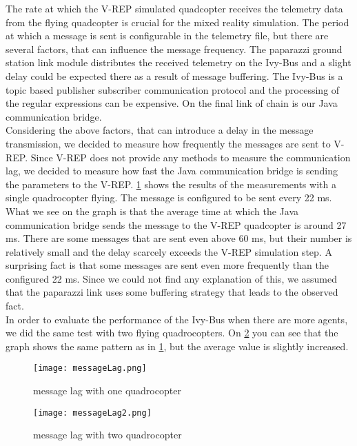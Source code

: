 The rate at which the V-REP simulated quadcopter receives the telemetry data from the flying quadcopter is crucial for the mixed reality simulation. The period at which a message is sent is configurable in the telemetry file, but there are several factors, that can influence the message frequency. The paparazzi ground station link module distributes the received telemetry on the Ivy-Bus and a slight delay could be expected there as a result of message buffering. The Ivy-Bus is a topic based publisher subscriber communication protocol and the processing of the regular expressions can be expensive. On the final link of chain is our Java communication bridge.\\

Considering the above factors, that can introduce a delay in the message transmission, we decided to measure how frequently the messages are sent to V-REP. Since V-REP does not provide any methods to measure the communication lag, we decided to measure how fast the Java communication bridge is sending the parameters to the V-REP. \ref{fig:messageLag} shows the results of the measurements with a single quadrocopter flying. The message is configured to be sent every 22 ms. What we see on the graph is that the average time at which the Java communication bridge sends the message to the V-REP quadcopter is around 27 ms. There are some messages that are sent even above 60 ms, but their number is relatively small and the delay scarcely exceeds the V-REP simulation step. A surprising fact is that some messages are sent even more frequently than the configured 22 ms. Since we could not find any explanation of this, we assumed that the paparazzi link uses some buffering strategy that leads to the observed fact. \\
In order to evaluate the performance of the Ivy-Bus when there are more agents, we did the same test with two flying quadrocopters. On \ref{fig:messageLag2} you can see that the graph shows the same pattern as in \ref{fig:messageLag}, but the average value is slightly increased.\\

\begin{figure}[h!]
 \begin{center}
  \texttt{[image: messageLag.png]}
 \end{center}
  \caption{message lag with one quadrocopter\label{fig:messageLag}}
\end{figure}

\begin{figure}[h!]
 \begin{center}
  \texttt{[image: messageLag2.png]}
 \end{center}
  \caption{message lag with two quadrocopter\label{fig:messageLag2}}
\end{figure}



